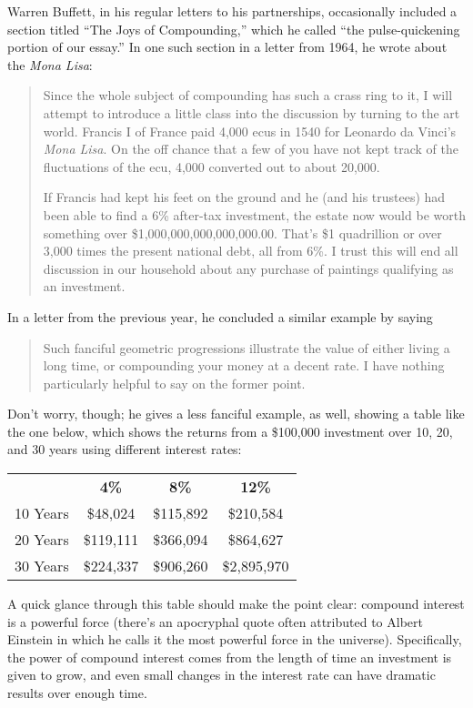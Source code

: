 \setcounter{ExampleCounter}{1}
Warren Buffett, in his regular letters to his partnerships, occasionally included a section titled ``The Joys of Compounding,'' which he called ``the pulse-quickening portion of our essay.''  In one such section in a letter from 1964, he wrote about the \emph{Mona Lisa}:
\begin{quote}
Since the whole subject of compounding has such a crass ring to it, I will attempt to introduce a little class into the discussion by turning to the art world.  Francis I of France paid 4,000 ecus in 1540 for Leonardo da Vinci's \emph{Mona Lisa}.  On the off chance that a few of you have not kept track of the fluctuations of the ecu, 4,000 converted out to about 20,000.

If Francis had kept his feet on the ground and he (and his trustees) had been able to find a 6\% after-tax investment, the estate now would be worth something over \$1,000,000,000,000,000.00.  That's \$1 quadrillion or over 3,000 times the present national debt, all from 6\%.  I trust this will end all discussion in our household about any purchase of paintings qualifying as an investment.
\end{quote}

In a letter from the previous year, he concluded a similar example by saying
\begin{quote}
Such fanciful geometric progressions illustrate the value of either living a long time, or compounding your money at a decent rate.  I have nothing particularly helpful to say on the former point.
\end{quote}

Don't worry, though; he gives a less fanciful example, as well, showing a table like the one below, which shows the returns from a \$100,000 investment over 10, 20, and 30 years using different interest rates:
\begin{center}
\begin{tabular}{l c c c}
 & \textbf{4\%} & \textbf{8\%} & \textbf{12\%}\\
10 Years & \$48,024 & \$115,892 & \$210,584\\
20 Years & \$119,111 & \$366,094 & \$864,627\\
30 Years & \$224,337 & \$906,260 & \$2,895,970
\end{tabular}
\end{center}

A quick glance through this table should make the point clear: compound interest is a powerful force (there's an apocryphal quote often attributed to Albert Einstein in which he calls it the most powerful force in the universe).  Specifically, the power of compound interest comes from the length of time an investment is given to grow, and even small changes in the interest rate can have dramatic results over enough time.

